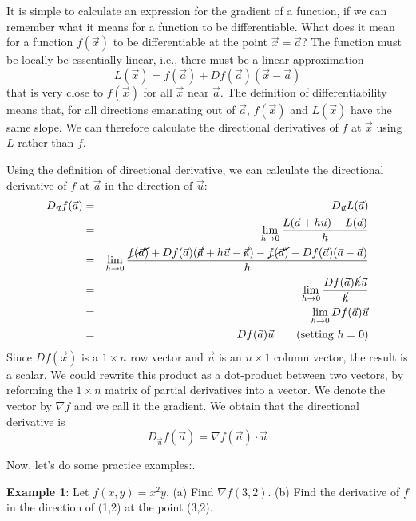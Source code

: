 \documentclass[conference,final,11pt,technote,onecolumn]{IEEEtran}\usepackage[]{graphicx}\usepackage[]{color}
\begin{document}
It is simple to calculate an expression for the gradient of a function, if we can remember what it means for a function to be differentiable. What does it mean for a function $f(\vec x)$ to be differentiable at the point $\vec x = \vec a$? The function must be locally be essentially linear, i.e., there must be a linear approximation
\[ L(\vec x) = f(\vec a) + Df(\vec a)(\vec x - \vec a) \]
that is very close to $f(\vec x)$ for all $\vec x$ near $\vec a$. The definition of differentiability means that, for all directions emanating out of $\vec a$, $f(\vec x)$ and $L(\vec x)$ have the same slope. We can therefore calculate the directional derivatives of $f$ at $\vec x$ using $L$ rather than $f$.

Using the definition of directional derivative, we can calculate the directional derivative of $f$ at $\vec a$ in the direction of $\vec u$:
\begin{eqnarray}
\nonumber D_{\vec u}f(\vec a) &=& D_{\vec u}L(\vec a)\\
\nonumber &=& \lim_{h\rightarrow 0}\dfrac{L(\vec a + h\vec u)-L(\vec a)}{h}\\
\nonumber &=& \lim_{h\rightarrow 0}\dfrac{\cancel{f(\vec a)}+Df(\vec a)(\cancel{\vec a} + h\vec u - \cancel{\vec a})-\cancel{f(\vec a)} - Df(\vec a)(\vec a-\vec a)}{h}\\
\nonumber &=& \lim_{h\rightarrow 0}\dfrac{Df(\vec a)\cancel{h}\vec u}{\cancel{h}}\\
\nonumber &=& \lim_{h\rightarrow 0}Df(\vec a)\vec u\\
\nonumber &=& Df(\vec a)\vec u\qquad (\text{setting $h=0$})
\end{eqnarray}
Since $Df(\vec x)$ is a $1\times n$ row vector and $\vec u$ is an $n\times 1$ column vector, the result is a scalar. We could rewrite this product as a dot-product between two vectors, by reforming the $1\times n$ matrix of partial derivatives into a vector. We denote the vector by $\nabla f$ and we call it the gradient. We obtain that the directional derivative is 
\[ D_{\vec u}f(\vec a) = \nabla f(\vec a)\cdot \vec u \]

Now, let's do some practice examples:\cite{mathInsight:DirectionalDerivativeExamples}.

\textbf{Example 1}: Let $f(x,y) = x^2y$. (a) Find $\nabla f(3,2)$. (b) Find the derivative of $f$ in the direction of (1,2) at the point (3,2).
\end{document}
